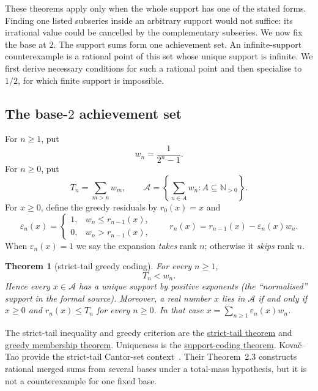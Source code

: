 \documentclass[11pt]{article}
\newcommand{\commit}{99f4bf47422abbd8757cbb22b50ba079d764d3a7}
\newcommand{\repobase}{https://github.com/wcook04/plectis-erdos/blob/\commit}
\newcommand{\PK}{Erdos249257}
\newcommand{\lword}[4]{\href{\repobase/\PK/#1\#L#2}{#4}}
\newtheorem{theorem}{Theorem}[section]
\theoremstyle{definition}
\theoremstyle{remark}
\newcommand{\Npos}{\mathbb{N}_{>0}}
\begin{document}
These theorems apply only when the whole support has one of the stated forms.
Finding one listed subseries inside an arbitrary support would not suffice:
its irrational value could be cancelled by the complementary subseries.  We
now fix the base at \(2\).  The support sums form one achievement set.  An
infinite-support counterexample is a rational point of this set whose unique
support is infinite.  We first derive necessary conditions for such a rational point and
then specialise to \(1/2\), for which finite support is impossible.

\subsection{The base-$2$ achievement set}

For \(n\geq1\), put
\[
 w_n=\frac1{2^n-1}.
\]
For \(n\geq0\), put
\[
 T_n=\sum_{m>n}w_m,
 \qquad
 \mathcal A=\left\{\sum_{n\in A}w_n:A\subseteq\Npos\right\}.
\]
For \(x\geq0\), define the greedy residuals by \(r_0(x)=x\) and
\[
 \varepsilon_n(x)=
 \begin{cases}
  1,&w_n\leq r_{n-1}(x),\\
  0,&w_n>r_{n-1}(x),
 \end{cases}
 \qquad
 r_n(x)=r_{n-1}(x)-\varepsilon_n(x)w_n.
\]
When \(\varepsilon_n(x)=1\) we say the expansion \emph{takes} rank \(n\);
otherwise it \emph{skips} rank \(n\).

\begin{theorem}[strict-tail greedy coding]\label{res:greedy}
For every \(n\geq1\),
\[
 T_n<w_n.
\]
Hence every \(x\in\mathcal A\)
has a unique support by positive exponents (the ``normalised'' support in the
formal source).
Moreover, a real number \(x\) lies in \(\mathcal A\) if and only if \(x\geq0\)
and \(r_n(x)\leq T_n\) for every \(n\geq0\).  In that case
\(x=\sum_{n\geq1}\varepsilon_n(x)w_n\).
\end{theorem}
\noindent The strict-tail inequality and greedy criterion are the
\lword{GreedyAchievementSet.lean}{180}{mersenneTail_lt_weight}{strict-tail theorem}
and
\lword{GreedyAchievementSet.lean}{1458}{mem_mersenneAchievementSet_iff_greedy_survival}{greedy membership theorem}.
Uniqueness is the
\lword{GreedyAchievementSet.lean}{1563}{positiveMersenneSupportValue_injective_normalized}{support-coding theorem}.
Kova\v{c}--Tao provide the strict-tail Cantor-set
context~\cite[Remark~4.1, p.~13]{kovactao}.  Their Theorem~2.3
\cite[p.~5; proof pp.~13--14]{kovactao} constructs rational merged sums from
several bases under a total-mass hypothesis, but it is not a counterexample
for one fixed base.
\end{document}
